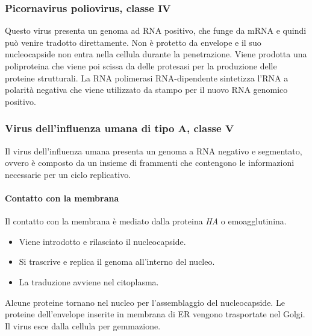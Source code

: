 		\subsubsection{Picornavirus poliovirus, classe $\mathbf{IV}$}
		Questo virus presenta un genoma ad RNA positivo, che funge da mRNA e quindi pu\`o venire tradotto direttamente. 
		Non \`e protetto da envelope e il suo nucleocapside non entra nella cellula durante la penetrazione.
		Viene prodotta una poliproteina che viene poi scissa da delle protesasi per la produzione delle proteine strutturali. 
		La RNA polimerasi RNA-dipendente sintetizza l'RNA a polarit\`a negativa che viene utilizzato da stampo per il nuovo RNA genomico positivo. 

		\subsubsection{Virus dell'influenza umana di tipo A, classe $\mathbf{V}$}
		Il virus dell'influenza umana presenta un genoma a RNA negativo e segmentato, ovvero \`e composto da un insieme di frammenti che contengono le informazioni necessarie per un ciclo replicativo.
		
			\paragraph{Contatto con la membrana}
			Il contatto con la membrana \`e mediato dalla proteina \emph{HA} o emoagglutinina.
			\begin{multicols}{2}
				\begin{itemize}
					\item Viene introdotto e rilasciato il nucleocapside.
					\item Si trascrive e replica il genoma all'interno del nucleo.
					\item La traduzione avviene nel citoplasma.
				\end{itemize}
			\end{multicols}
			Alcune proteine tornano nel nucleo per l'assemblaggio del nucleocapside.
			Le proteine dell'envelope inserite in membrana di ER vengono trasportate nel Golgi.
			Il virus esce dalla cellula per gemmazione.

